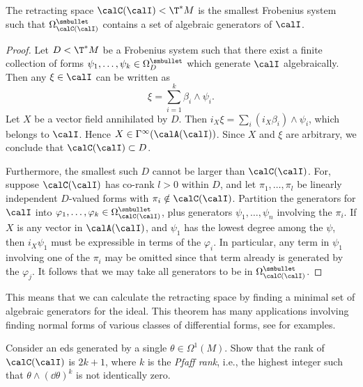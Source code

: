 \begin{thm}
    The retracting space $\calC(\calI)<\T^\ast M$ is the smallest Frobenius system such that $\Omega^{\smbullet}_{\calC(\calI)}$ contains a set of algebraic generators of $\calI$.
\end{thm}
\begin{proof}
    Let $D<\T^\ast M$ be a Frobenius system such that there exist a finite collection of forms $\psi_1,\ldots,\psi_k\in \Omega^{\smbullet}_D$ which generate $\calI$ algebraically. Then any $\xi\in \calI$ can be written as
    \[\xi=\sum_{i=1}^k \beta_i\wedge \psi_i.\]
    Let $X$ be a vector field annihilated by $D$. Then $i_X \xi=\sum_i (i_X \beta_i)\wedge\psi_i$, which belongs to $\calI$. Hence $X\in\Gamma^\infty(\calA(\calI))$. Since $X$ and $\xi$ are arbitrary, we conclude that $\calC(\calI)\subset D$.

    Furthermore, the smallest such $D$ cannot be larger than $\calC(\calI)$. For, suppose $\calC(\calI)$ has co-rank $l>0$ within $D$, and let $\pi_1,\ldots,\pi_l$ be linearly independent $D$-valued forms with $\pi_i\notin \calC(\calI)$. Partition the generators for $\calI$ into $\varphi_1,\ldots,\varphi_k\in \Omega^{\smbullet}_{\calC(\calI)}$, plus generators $\psi_1,\ldots,\psi_n$ involving the $\pi_i$. If $X$ is any vector in $\calA(\calI)$, and $\psi_1$ has the lowest degree among the $\psi$, then $i_X\psi_1$ must be expressible in terms of the $\varphi_i$. In particular, any term in $\psi_1$ involving one of the $\pi_i$ may be omitted since that term already is generated by the $\varphi_j$. It follows that we may take all generators to be in $\Omega^{\smbullet}_{\calC(\calI)}$.
\end{proof}

This means that we can calculate the retracting space by finding a minimal set of algebraic generators for the ideal. This theorem has many applications involving finding normal forms of various classes of differential forms, see \cite[\S I.1]{Bryant} for examples.

\begin{xca}
    Consider an \gls{eds} generated by a single $\theta\in\Omega^1(M)$. Show that the rank of $\calC(\calI)$ is $2k+1$, where $k$ is the \emph{Pfaff rank}, i.e., the highest integer such that $\theta\wedge (\dd\theta)^k$ is not identically zero.
\end{xca}


